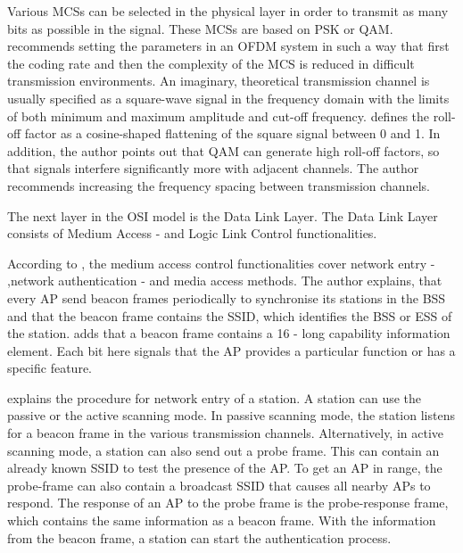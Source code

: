\documentclass[]{nsm-thesis}
\begin{document}
Various \ac{MCS}s can be selected in the physical layer in order to transmit as many bits as possible in the signal. 
These \ac{MCS}s are based on \ac{PSK} or \ac{QAM}. 
\textcite{kauffels_wireless_2002} recommends setting the parameters in an \ac{OFDM} system in such a way that first the coding rate and then the complexity of the \ac{MCS} is reduced in difficult transmission environments.
An imaginary, theoretical transmission channel is usually specified as a square-wave signal in the frequency domain with the limits of both minimum and maximum amplitude and cut-off frequency. \textcite{kauffels_wireless_2002} defines the roll-off factor as a cosine-shaped flattening of the square signal between 0 and 1. In addition, the author points out that \ac{QAM} can generate high roll-off factors, so that signals interfere significantly more with adjacent channels.
The author recommends increasing the frequency spacing between transmission channels.





The next layer in the OSI model is the Data Link Layer.
The Data Link Layer consists of Medium Access - and Logic Link Control functionalities.


According to \textcite{kauffels_wireless_2002}, the medium access control functionalities cover network entry - ,network authentication - and media access methods.
The author explains, that every \ac{AP} send beacon frames periodically to synchronise its stations in the \ac{BSS} and that the beacon frame contains the \ac{SSID}, which identifies the \ac{BSS} or \ac{ESS} of the station. \textcite{sauter_wireless_2022} adds that a beacon frame contains a \SI{16}{\bit} - long capability information element. Each bit here signals that the \ac{AP} provides a particular function or has a specific feature. 

\textcite{kauffels_wireless_2002} explains the procedure for network entry of a station. A station can use the passive or the active scanning mode. In passive scanning mode, the station listens for a beacon frame in the various transmission channels. Alternatively, in active scanning mode, a station can also send out a probe frame. This can contain an already known \ac{SSID} to test the presence of the \ac{AP}. To get an \ac{AP} in range, the probe-frame can also contain a broadcast SSID that causes all nearby \ac{AP}s to respond. The response of an \ac{AP} to the probe frame is the probe-response frame, which contains the same information as a beacon frame. With the information from the beacon frame, a station can start the authentication process.
 
\end{document}
